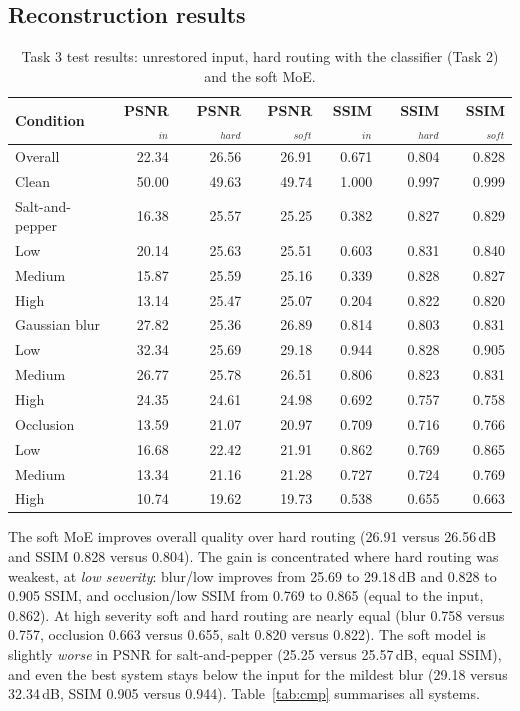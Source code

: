 \documentclass[conference]{IEEEtran}
\begin{document}
\subsection{Reconstruction results}
\begin{table}[t]
\centering
\caption{Task 3 test results: unrestored input, hard routing with the classifier (Task 2) and the soft MoE.}\label{tab:soft}
\footnotesize\setlength{\tabcolsep}{6pt}
\begin{tabular}{@{}lrrrrrr@{}}
\toprule
Condition & PSNR$_{in}$ & PSNR$_{hard}$ & PSNR$_{soft}$ & SSIM$_{in}$ & SSIM$_{hard}$ & SSIM$_{soft}$\\
\midrule
Overall & 22.34 & 26.56 & 26.91 & 0.671 & 0.804 & 0.828 \\
\midrule
Clean & 50.00 & 49.63 & 49.74 & 1.000 & 0.997 & 0.999 \\
\midrule
Salt-and-pepper & 16.38 & 25.57 & 25.25 & 0.382 & 0.827 & 0.829 \\
\quad Low & 20.14 & 25.63 & 25.51 & 0.603 & 0.831 & 0.840 \\
\quad Medium & 15.87 & 25.59 & 25.16 & 0.339 & 0.828 & 0.827 \\
\quad High & 13.14 & 25.47 & 25.07 & 0.204 & 0.822 & 0.820 \\
\midrule
Gaussian blur & 27.82 & 25.36 & 26.89 & 0.814 & 0.803 & 0.831 \\
\quad Low & 32.34 & 25.69 & 29.18 & 0.944 & 0.828 & 0.905 \\
\quad Medium & 26.77 & 25.78 & 26.51 & 0.806 & 0.823 & 0.831 \\
\quad High & 24.35 & 24.61 & 24.98 & 0.692 & 0.757 & 0.758 \\
\midrule
Occlusion & 13.59 & 21.07 & 20.97 & 0.709 & 0.716 & 0.766 \\
\quad Low & 16.68 & 22.42 & 21.91 & 0.862 & 0.769 & 0.865 \\
\quad Medium & 13.34 & 21.16 & 21.28 & 0.727 & 0.724 & 0.769 \\
\quad High & 10.74 & 19.62 & 19.73 & 0.538 & 0.655 & 0.663 \\
\bottomrule
\end{tabular}
\end{table}

The soft MoE improves overall quality over hard routing (26.91 versus 26.56\,dB and SSIM 0.828 versus 0.804). The gain is concentrated where hard routing was weakest, at \emph{low severity}: blur/low improves from 25.69 to 29.18\,dB and 0.828 to 0.905 SSIM, and occlusion/low SSIM from 0.769 to 0.865 (equal to the input, 0.862). At high severity soft and hard routing are nearly equal (blur 0.758 versus 0.757, occlusion 0.663 versus 0.655, salt 0.820 versus 0.822). The soft model is slightly \emph{worse} in PSNR for salt-and-pepper (25.25 versus 25.57\,dB, equal SSIM), and even the best system stays below the input for the mildest blur (29.18 versus 32.34\,dB, SSIM 0.905 versus 0.944). Table~\ref{tab:cmp} summarises all systems.
\end{document}
